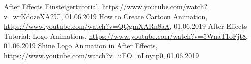 \begin{thebibliography}{9}
After Effects Einsteigertutorial,
\url{https://www.youtube.com/watch?v=wrKdozeXA2Ul},
01.06.2019
How to Create Cartoon Animation,
\url{https://www.youtube.com/watch?v=QQgmXARn8aA},
01.06.2019
After Effects Tutorial: Logo Animations,
\url{https://www.youtube.com/watch?v=5WnaT1oFjt8},
01.06.2019
Shine Logo Animation in After Effects,
\url{https://www.youtube.com/watch?v=uEO_nLnytp0},
01.06.2019
\end{thebibliography}